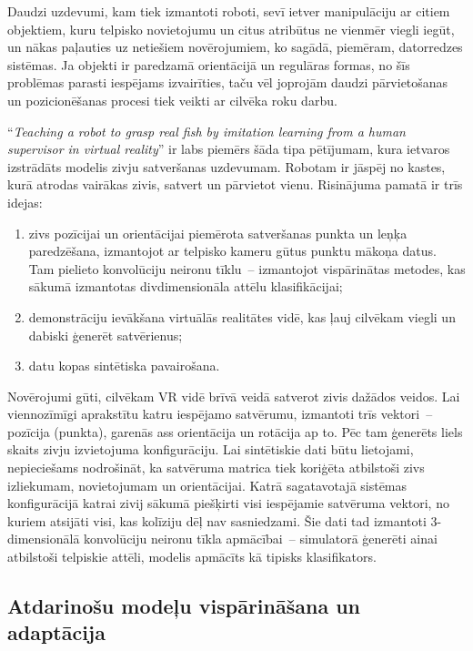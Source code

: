 \documentclass[12pt, a4paper]{article}
\numberwithin{equation}{section} %
\begin{document}
Daudzi uzdevumi, kam tiek izmantoti roboti, sevī ietver manipulāciju ar citiem objektiem, kuru telpisko novietojumu un citus atribūtus ne vienmēr viegli iegūt, un nākas paļauties uz netiešiem novērojumiem, ko sagādā, piemēram, datorredzes sistēmas. Ja objekti ir paredzamā orientācijā un regulāras formas, no šīs problēmas parasti iespējams izvairīties, taču vēl joprojām daudzi pārvietošanas un pozicionēšanas procesi tiek veikti ar cilvēka roku darbu.

``\textit{Teaching a robot to grasp real fish by imitation learning from a human supervisor in virtual reality}'' \cite{dyrstad2018teaching} ir labs piemērs šāda tipa pētījumam, kura ietvaros izstrādāts modelis zivju satveršanas uzdevumam. Robotam ir jāspēj no kastes, kurā atrodas vairākas zivis, satvert un pārvietot vienu. Risinājuma pamatā ir trīs idejas:

\begin{enumerate}
    \item zivs pozīcijai un orientācijai piemērota satveršanas punkta un leņķa paredzēšana, izmantojot ar telpisko kameru gūtus punktu mākoņa datus. Tam pielieto konvolūciju neironu tīklu~-- izmantojot vispārinātas metodes, kas sākumā izmantotas divdimensionāla attēlu klasifikācijai;
    \item demonstrāciju ievākšana virtuālās realitātes vidē, kas ļauj cilvēkam viegli un dabiski ģenerēt satvērienus;
    \item datu kopas sintētiska pavairošana.
\end{enumerate}

Novērojumi gūti, cilvēkam VR vidē brīvā veidā satverot zivis dažādos veidos. Lai viennozīmīgi aprakstītu katru iespējamo satvērumu, izmantoti trīs vektori~-- pozīcija (punkta), garenās ass orientācija un rotācija ap to.  Pēc tam ģenerēts liels skaits zivju izvietojuma konfigurāciju. Lai sintētiskie dati būtu lietojami, nepieciešams nodrošināt, ka satvēruma matrica tiek koriģēta atbilstoši zivs izliekumam, novietojumam un orientācijai. Katrā sagatavotajā sistēmas konfigurācijā katrai zivij sākumā piešķirti visi iespējamie satvēruma vektori, no kuriem atsijāti visi, kas kolīziju dēļ nav sasniedzami. Šie dati tad izmantoti 3-dimensionālā konvolūciju neironu tīkla apmācībai~-- simulatorā ģenerēti ainai atbilstoši telpiskie attēli, modelis apmācīts kā tipisks klasifikators.

\subsection{Atdarinošu modeļu vispārināšana un adaptācija}
\end{document}
